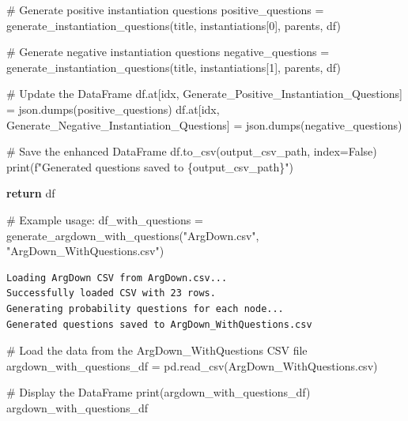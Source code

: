\documentclass[
  11pt,
  letterpaper,
]{book}
\newenvironment{Shaded}{\begin{snugshade}}{\end{snugshade}}
\newcommand{\BuiltInTok}[1]{\textcolor[rgb]{0.00,0.23,0.31}{#1}}
\newcommand{\CommentTok}[1]{\textcolor[rgb]{0.37,0.37,0.37}{#1}}
\newcommand{\ControlFlowTok}[1]{\textcolor[rgb]{0.00,0.23,0.31}{\textbf{#1}}}
\newcommand{\DecValTok}[1]{\textcolor[rgb]{0.68,0.00,0.00}{#1}}
\newcommand{\NormalTok}[1]{\textcolor[rgb]{0.00,0.23,0.31}{#1}}
\newcommand{\OperatorTok}[1]{\textcolor[rgb]{0.37,0.37,0.37}{#1}}
\newcommand{\SpecialCharTok}[1]{\textcolor[rgb]{0.37,0.37,0.37}{#1}}
\newcommand{\SpecialStringTok}[1]{\textcolor[rgb]{0.13,0.47,0.30}{#1}}
\newcommand{\StringTok}[1]{\textcolor[rgb]{0.13,0.47,0.30}{#1}}
\newcommand{\VariableTok}[1]{\textcolor[rgb]{0.07,0.07,0.07}{#1}}
\begin{document}
\begin{Shaded}
\begin{Highlighting}[]
        \CommentTok{\# Generate positive instantiation questions}
\NormalTok{        positive\_questions }\OperatorTok{=}\NormalTok{ generate\_instantiation\_questions(title, instantiations[}\DecValTok{0}\NormalTok{], parents, df)}

        \CommentTok{\# Generate negative instantiation questions}
\NormalTok{        negative\_questions }\OperatorTok{=}\NormalTok{ generate\_instantiation\_questions(title, instantiations[}\DecValTok{1}\NormalTok{], parents, df)}

        \CommentTok{\# Update the DataFrame}
\NormalTok{        df.at[idx, }\StringTok{\textquotesingle{}Generate\_Positive\_Instantiation\_Questions\textquotesingle{}}\NormalTok{] }\OperatorTok{=}\NormalTok{ json.dumps(positive\_questions)}
\NormalTok{        df.at[idx, }\StringTok{\textquotesingle{}Generate\_Negative\_Instantiation\_Questions\textquotesingle{}}\NormalTok{] }\OperatorTok{=}\NormalTok{ json.dumps(negative\_questions)}

    \CommentTok{\# Save the enhanced DataFrame}
\NormalTok{    df.to\_csv(output\_csv\_path, index}\OperatorTok{=}\VariableTok{False}\NormalTok{)}
    \BuiltInTok{print}\NormalTok{(}\SpecialStringTok{f"Generated questions saved to }\SpecialCharTok{\{}\NormalTok{output\_csv\_path}\SpecialCharTok{\}}\SpecialStringTok{"}\NormalTok{)}

    \ControlFlowTok{return}\NormalTok{ df}

\CommentTok{\# Example usage:}
\NormalTok{df\_with\_questions }\OperatorTok{=}\NormalTok{ generate\_argdown\_with\_questions(}\StringTok{"ArgDown.csv"}\NormalTok{, }\StringTok{"ArgDown\_WithQuestions.csv"}\NormalTok{)}
\end{Highlighting}
\end{Shaded}

\begin{verbatim}
Loading ArgDown CSV from ArgDown.csv...
Successfully loaded CSV with 23 rows.
Generating probability questions for each node...
Generated questions saved to ArgDown_WithQuestions.csv
\end{verbatim}

\begin{Shaded}
\begin{Highlighting}[]
\CommentTok{\# Load the data from the ArgDown\_WithQuestions CSV file}
\NormalTok{argdown\_with\_questions\_df }\OperatorTok{=}\NormalTok{ pd.read\_csv(}\StringTok{\textquotesingle{}ArgDown\_WithQuestions.csv\textquotesingle{}}\NormalTok{)}

\CommentTok{\# Display the DataFrame}
\BuiltInTok{print}\NormalTok{(argdown\_with\_questions\_df)}
\NormalTok{argdown\_with\_questions\_df}
\end{Highlighting}
\end{Shaded}
\end{document}
